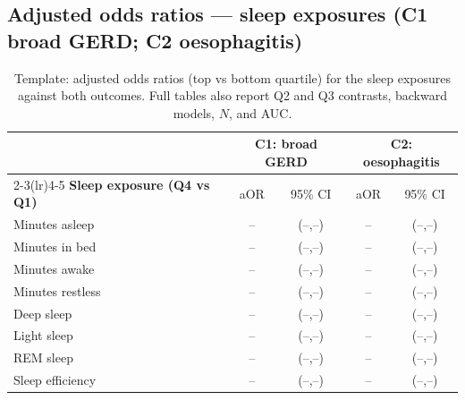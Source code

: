 \documentclass[11pt]{article}
\begin{document}
\subsection{Adjusted odds ratios --- sleep exposures (C1 broad GERD; C2 oesophagitis)}
\begin{table}[h]
\centering
\footnotesize
\begin{tabular}{@{}l cc cc@{}}
\toprule
& \multicolumn{2}{c}{\textbf{C1: broad GERD}} & \multicolumn{2}{c}{\textbf{C2: oesophagitis}} \\
\cmidrule(lr){2-3}\cmidrule(lr){4-5}
\textbf{Sleep exposure (Q4 vs Q1)} & aOR & 95\% CI & aOR & 95\% CI \\
\midrule
Minutes asleep        & -- & (--,--) & -- & (--,--) \\
Minutes in bed        & -- & (--,--) & -- & (--,--) \\
Minutes awake         & -- & (--,--) & -- & (--,--) \\
Minutes restless      & -- & (--,--) & -- & (--,--) \\
Deep sleep            & -- & (--,--) & -- & (--,--) \\
Light sleep           & -- & (--,--) & -- & (--,--) \\
REM sleep             & -- & (--,--) & -- & (--,--) \\
Sleep efficiency      & -- & (--,--) & -- & (--,--) \\
\bottomrule
\end{tabular}
\caption{Template: adjusted odds ratios (top vs bottom quartile) for the sleep exposures against both
outcomes. Full tables also report Q2 and Q3 contrasts, backward models, $N$, and AUC.}
\end{table}
\end{document}

